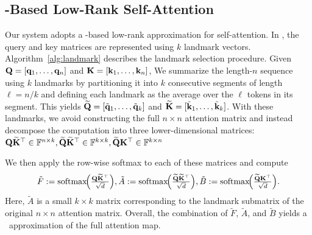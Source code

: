 \documentclass[letterpaper,twocolumn,10pt]{article}
\begin{document}

\subsection{\nystrom-Based Low-Rank Self-Attention}
Our system adopts a \nystrom-based low-rank approximation for self-attention. In \nystromformer, the query and key matrices are represented using $k$ landmark vectors.
Algorithm~\ref{alg:landmark} describes the landmark selection procedure. Given ${\mathbf{Q}}=[\mathbf{q}_1,\ldots,\mathbf{q}_n]$ and ${\mathbf{K}}=[\mathbf{k}_1,\ldots,\mathbf{k}_n]$, We summarize the length-$n$ sequence using $k$ landmarks by partitioning it into $k$ consecutive segments of length $\ell = n/k$ and defining each landmark as the average over the $\ell$ tokens in its segment. This yields $\widetilde{{\mathbf{Q}}}=[\tilde{\mathbf{q}}_1,\ldots,\tilde{\mathbf{q}}_k]$ and $\widetilde{{\mathbf{K}}}=[\tilde{\mathbf{k}}_1,\ldots,\tilde{\mathbf{k}}_k]$. 
With these landmarks, we avoid constructing the full $n\times n$ attention matrix and instead decompose the computation into three lower-dimensional matrices: ${\mathbf{Q}}\widetilde{{\mathbf{K}}}^{\top} \in \mathbb{F}^{n \times k}, \widetilde{{\mathbf{Q}}}\widetilde{{\mathbf{K}}}^{\top} \in \mathbb{F}^{k \times k}, \widetilde{{\mathbf{Q}}}{\mathbf{K}}^{\top} \in \mathbb{F}^{k \times n}$

We then apply the row-wise softmax to each of these matrices and compute
\[
\tilde{F} := {\mathrm{softmax}}\!\Bigl(\tfrac{{\mathbf{Q}}\widetilde{{\mathbf{K}}}^{\top}}{\sqrt{d}}\Bigr),
\tilde{A} := {\mathrm{softmax}}\!\Bigl(\tfrac{\widetilde{{\mathbf{Q}}}\widetilde{{\mathbf{K}}}^{\top}}{\sqrt{d}}\Bigr),
\tilde{B} := {\mathrm{softmax}}\!\Bigl(\tfrac{\widetilde{{\mathbf{Q}}}{\mathbf{K}}^{\top}}{\sqrt{d}}\Bigr).
\]
Here, $\tilde{A}$ is a small $k\times k$ matrix corresponding to the landmark submatrix of the original $n \times n$ attention matrix.
Overall, the combination of $\tilde{F}$, $\tilde{A}$, and $\tilde{B}$ yields a \nystrom\ approximation of the full attention map.
\end{document}
